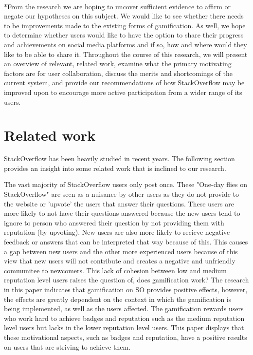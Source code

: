 \documentclass{sigchi}
\begin{document}
\\*From the research we are hoping to uncover sufficient evidence to affirm or negate our hypotheses on this subject. We would like to see whether there needs to be improvements made to the existing forms of gamification. As well, we hope to determine whether users would like to have the option to share their progress and achievements on social media platforms and if so, how and where would they like to be able to share it.
Throughout the course of this research, we will present an overview of relevant, related work, examine what the primary motivating factors are for user collaboration, discuss the merits and shortcomings of the current system, and provide our recommendations of how StackOverflow may be improved upon to encourage more active participation from a wider range of its users. 

\section{Related work}
StackOverflow has been heavily studied in recent years. The following section provides an insight into some related work that is inclined to our research.

The vast majority of StackOverflow users only post once. These "One-day flies on StackOverflow" are seen as a nuisance by other users as they do not provide to the website or 'upvote' the users that answer their questions. \cite{Slag} These users are more likely to not have their questions answered because the new users tend to ignore to person who answered their question by not providing them with reputation (by upvoting). New users are also more likely to recieve negative feedback or answers that can be interpreted that way because of this. This causes a gap between new users and the other more experienced users because of this view that new users will not contribute and creates a negative and unfriendly communitee to newcomers. This lack of cohesion between low and medium reputation level users raises the question of, does gamification work? \cite{Hamari} The research in this paper indicates that gamification on SO provides positive effects, however, the effects are greatly dependent on the context in which the gamification is being implemented, as well as the users affected. The gamification rewards users who work hard to achieve badges and reputation such as the medium reputation level users but lacks in the lower reputation level users. This paper displays that these motivational aspects, such as badges and reputation, have a positive results on users that are striving to achieve them. 
\end{document}

